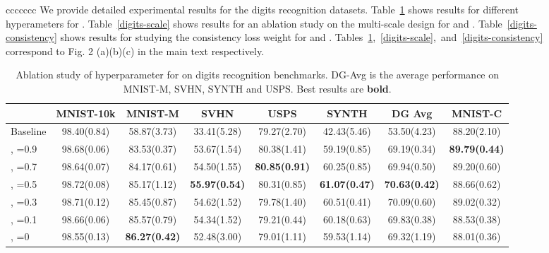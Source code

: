 \documentclass{article} \usepackage{iclr2021_conference,times}
\begin{document}
\begin{figure}[t]
\begin{center}
\begin{adjustbox}{max width=\textwidth}
\begin{tabular}{ccccccc}
We provide detailed experimental results for the digits recognition datasets.  Table~\ref{digits-p} shows results for different hyperameters  for . Table~\ref{digits-scale} shows results for an ablation study on the multi-scale design for  and . Table~\ref{digits-consistency} shows results for studying the consistency loss weight  for  and . Tables~\ref{digits-p},~\ref{digits-scale},~and~\ref{digits-consistency} correspond to Fig. 2 (a)(b)(c) in the main text respectively.
\label{results}
\begin{table}[htp]
	\small
	\centering
\caption{Ablation study of hyperparameter  for  on digits recognition benchmarks. DG-Avg is the average performance on MNIST-M, SVHN, SYNTH and USPS. Best results are \textbf{bold}.}
	\label{digits-p}
	\begin{tabular}{l|c|ccccc|c}
		\toprule
		& MNIST-10k    & MNIST-M    & SVHN        & USPS        & SYNTH       & DG Avg         & MNIST-C     \\
		\midrule
		Baseline    & 98.40\tiny(0.84) & 58.87\tiny(3.73) & 33.41\tiny(5.28) & 79.27\tiny(2.70) & 42.43\tiny(5.46) & 53.50\tiny(4.23) & 88.20\tiny(2.10) \\
		\tiny, =0.9 & 98.68\tiny(0.06) & 83.53\tiny(0.37) & 53.67\tiny(1.54) & 80.38\tiny(1.41) & 59.19\tiny(0.85) & 69.19\tiny(0.34) & \textbf{89.79\tiny(0.44)} \\
		\tiny, =0.7 & 98.64\tiny(0.07) & 84.17\tiny(0.61) & 54.50\tiny(1.55) & \textbf{80.85\tiny(0.91)} & 60.25\tiny(0.85) & 69.94\tiny(0.50) & 89.20\tiny(0.60) \\
		\tiny, =0.5 & 98.72\tiny(0.08) & 85.17\tiny(1.12) & \textbf{55.97\tiny(0.54)} & 80.31\tiny(0.85) & \textbf{61.07\tiny(0.47)} & \textbf{70.63\tiny(0.42)} & 88.66\tiny(0.62) \\
		\tiny, =0.3 & 98.71\tiny(0.12) & 85.45\tiny(0.87) & 54.62\tiny(1.52) & 79.78\tiny(1.40) & 60.51\tiny(0.41) & 70.09\tiny(0.60) & {89.02\tiny(0.32)} \\
		\tiny, =0.1 & 98.66\tiny(0.06) & 85.57\tiny(0.79) & 54.34\tiny(1.52) & 79.21\tiny(0.44) & 60.18\tiny(0.63) & 69.83\tiny(0.38) & 88.53\tiny(0.38) \\
		\tiny, =0 & 98.55\tiny(0.13) & \textbf{86.27\tiny(0.42)} & 52.48\tiny(3.00) & 79.01\tiny(1.11) & 59.53\tiny(1.14) & 69.32\tiny(1.19) & 88.01\tiny(0.36) \\
		\bottomrule
	\end{tabular}
\end{table}
\begin{table}[htp]
	\small
	\centering
	\setlength{\tabcolsep}{3pt}

\end{table}
\end{tabular}
\end{adjustbox}
\end{center}
\end{figure}
\end{document}
